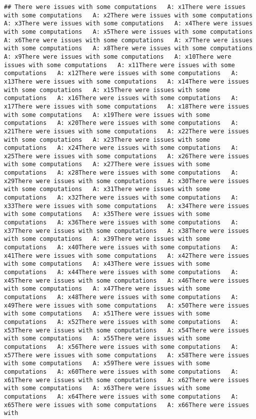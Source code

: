 \documentclass[
]{article}
\begin{document}
\begin{verbatim}
## There were issues with some computations   A: x1There were issues with some computations   A: x2There were issues with some computations   A: x3There were issues with some computations   A: x4There were issues with some computations   A: x5There were issues with some computations   A: x6There were issues with some computations   A: x7There were issues with some computations   A: x8There were issues with some computations   A: x9There were issues with some computations   A: x10There were issues with some computations   A: x11There were issues with some computations   A: x12There were issues with some computations   A: x13There were issues with some computations   A: x14There were issues with some computations   A: x15There were issues with some computations   A: x16There were issues with some computations   A: x17There were issues with some computations   A: x18There were issues with some computations   A: x19There were issues with some computations   A: x20There were issues with some computations   A: x21There were issues with some computations   A: x22There were issues with some computations   A: x23There were issues with some computations   A: x24There were issues with some computations   A: x25There were issues with some computations   A: x26There were issues with some computations   A: x27There were issues with some computations   A: x28There were issues with some computations   A: x29There were issues with some computations   A: x30There were issues with some computations   A: x31There were issues with some computations   A: x32There were issues with some computations   A: x33There were issues with some computations   A: x34There were issues with some computations   A: x35There were issues with some computations   A: x36There were issues with some computations   A: x37There were issues with some computations   A: x38There were issues with some computations   A: x39There were issues with some computations   A: x40There were issues with some computations   A: x41There were issues with some computations   A: x42There were issues with some computations   A: x43There were issues with some computations   A: x44There were issues with some computations   A: x45There were issues with some computations   A: x46There were issues with some computations   A: x47There were issues with some computations   A: x48There were issues with some computations   A: x49There were issues with some computations   A: x50There were issues with some computations   A: x51There were issues with some computations   A: x52There were issues with some computations   A: x53There were issues with some computations   A: x54There were issues with some computations   A: x55There were issues with some computations   A: x56There were issues with some computations   A: x57There were issues with some computations   A: x58There were issues with some computations   A: x59There were issues with some computations   A: x60There were issues with some computations   A: x61There were issues with some computations   A: x62There were issues with some computations   A: x63There were issues with some computations   A: x64There were issues with some computations   A: x65There were issues with some computations   A: x66There were issues with 
\end{verbatim}
\end{document}
